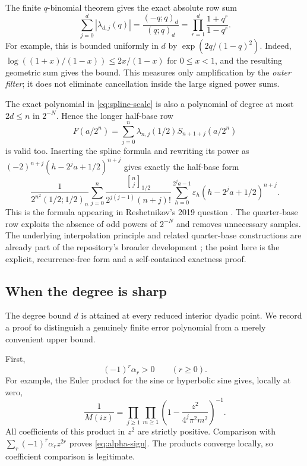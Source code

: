 \documentclass[11pt,a4paper]{article}
\theoremstyle{definition}
\theoremstyle{remark}
\newcommand{\eps}{\varepsilon}
\newcommand{\qbinom}[3]{\genfrac{[}{]}{0pt}{}{#1}{#2}_{#3}}
\begin{document}
The finite \(q\)-binomial theorem gives the exact absolute row sum
\begin{equation}
 \sum_{j=0}^{d}|\lambda_{d,j}(q)|
   =\frac{(-q;q)_d}{(q;q)_d}
   =\prod_{r=1}^{d}\frac{1+q^r}{1-q^r}.                 \label{eq:weight-norm}
\end{equation}
For example, this is bounded uniformly in \(d\) by
\(\exp(2q/(1-q)^2)\).  Indeed,
\(\log((1+x)/(1-x))\leq2x/(1-x)\) for \(0\leq x<1\), and the resulting geometric
sum gives the bound.  This measures only amplification by the \emph{outer filter};
it does not eliminate cancellation inside the large signed power sums.

The exact polynomial in \eqref{eq:spline-scale} is also a polynomial of degree at
most \(2d\leq n\) in \(2^{-N}\).  Hence the longer half-base row
\begin{equation}
 F(a/2^n)=\sum_{j=0}^{n}\lambda_{n,j}(1/2)
                         S_{n+1+j}(a/2^n)               \label{eq:half-filter}
\end{equation}
is valid too.  Inserting the spline formula and rewriting its power as
\((-2)^{n+j}(h-2^ja+1/2)^{n+j}\) gives exactly the half-base form
\begin{equation}
 \frac{1}{2^{n^2}(1/2;1/2)_n}
 \sum_{j=0}^{n}\frac{\qbinom{n}{j}{1/2}}{2^{j(j-1)}(n+j)!}
       \sum_{h=0}^{2^ja-1}\eps_h
                  (h-2^ja+1/2)^{n+j}.                 \label{eq:classical-half}
\end{equation}
This is the formula appearing in Reshetnikov's 2019 question
\cite{reshetnikov2019}.  The quarter-base row exploits the absence of odd powers of
\(2^{-N}\) and removes unnecessary samples.  The underlying interpolation
principle and related quarter-base constructions are already part of the
repository's broader development \cite{repo}; the point here is the explicit,
recurrence-free form and a self-contained exactness proof.

\subsection{When the degree is sharp}
The degree bound \(d\) is attained at every reduced interior dyadic point.
We record a proof to distinguish a genuinely finite error polynomial from a
merely convenient upper bound.

First,
\begin{equation}
 (-1)^r\alpha_r>0\qquad(r\geq0).                         \label{eq:alpha-sign}
\end{equation}
For example, the Euler product for the sine or hyperbolic sine
\cite[\S4.36]{dlmf} gives, locally at zero,
\[
 \frac1{M(iz)}
 =\prod_{j\geq1}\prod_{m\geq1}
     \left(1-\frac{z^2}{4^j\pi^2m^2}\right)^{-1}.
\]
All coefficients of this product in \(z^2\) are strictly positive.  Comparison
with \(\sum_r(-1)^r\alpha_rz^{2r}\) proves \eqref{eq:alpha-sign}.
The products converge locally, so coefficient comparison is legitimate.
\end{document}
